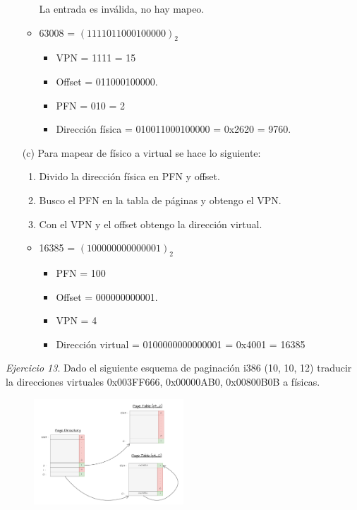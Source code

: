 \documentclass[12pt]{article}
\begin{document}
\begin{rta}
\begin{itemize}
\begin{itemize}
\begin{itemize}
            \end{itemize}
            La entrada es inválida, no hay mapeo.
            \item 63008 = $(1111011000100000)_2$
            \begin{itemize}
                \item VPN = 1111 = 15
                \item Offset = 011000100000.
                \item PFN = 010 = 2
                \item Dirección física = 010011000100000 = 0x2620 = 9760.
            \end{itemize}
        \end{itemize}
        \item[(c)] Para mapear de físico a virtual se hace lo siguiente:
        \begin{enumerate}
            \item Divido la dirección física en PFN y offset.
            \item Busco el PFN en la tabla de páginas y obtengo el VPN.
            \item Con el VPN y el offset obtengo la dirección virtual.
        \end{enumerate}
        \begin{itemize}
            \item 16385 = $(100000000000001)_2$
            \begin{itemize}
                \item PFN = 100
                \item Offset = 000000000001.
                \item VPN = 4
                \item Dirección virtual = 0100000000000001 = 0x4001 = 16385
            \end{itemize}
        \end{itemize}
    \end{itemize}
\end{rta}

\newpage
\noindent \textit{Ejercicio 13}. Dado el siguiente esquema de paginación i386 (10, 10, 12) traducir la direcciones virtuales 0x003FF666, 0x00000AB0, 0x00800B0B a físicas.

\begin{figure}[h]
    \centering
    \includegraphics[width=0.5\textwidth]{ej131.pdf}
\end{figure}
\end{document}
